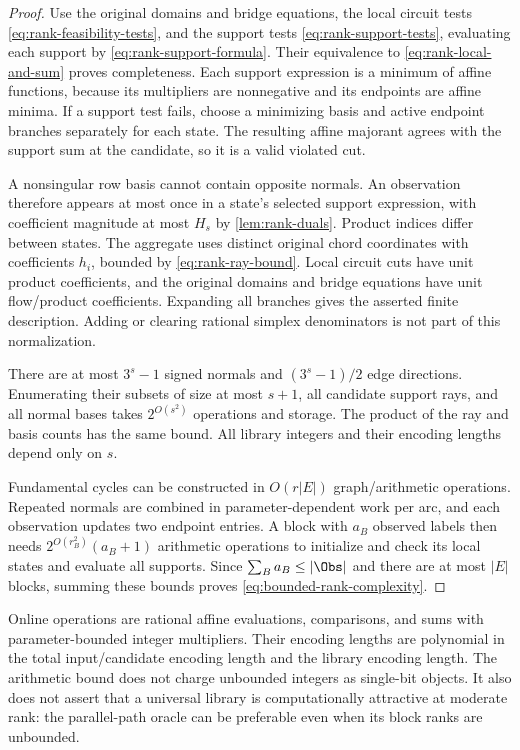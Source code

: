 \begin{proof}
Use the original domains and bridge equations, the local circuit tests
\eqref{eq:rank-feasibility-tests}, and the support tests
\eqref{eq:rank-support-tests}, evaluating each support by
\eqref{eq:rank-support-formula}. Their equivalence to
\eqref{eq:rank-local-and-sum} proves completeness. Each support expression
is a minimum of affine functions, because its multipliers are nonnegative
and its endpoints are affine minima. If a support test fails, choose
a minimizing basis and active endpoint branches separately for each
state. The resulting affine majorant agrees with the support sum at
the candidate, so it is a valid violated cut.

A nonsingular row basis cannot contain opposite normals. An observation
therefore appears at most once in a state's selected support expression,
with coefficient magnitude at most $H_s$ by
\cref{lem:rank-duals}. Product indices differ between states. The
aggregate uses distinct original chord coordinates with coefficients
$h_i$, bounded by \eqref{eq:rank-ray-bound}. Local circuit cuts have
unit product coefficients, and the original domains and bridge equations
have unit flow/product coefficients. Expanding all branches gives the
asserted finite description. Adding or clearing rational simplex
denominators is not part of this normalization.

There are at most $3^s-1$ signed normals and $(3^s-1)/2$ edge directions.
Enumerating their subsets of size at most $s+1$, all candidate support
rays, and all normal bases takes $2^{O(s^2)}$ operations and storage.
The product of the ray and basis counts has the same bound. All library
integers and their encoding lengths depend only on $s$.

Fundamental cycles can be constructed in $O(r|E|)$ graph/arithmetic
operations. Repeated normals are combined in parameter-dependent work
per arc, and each observation updates two endpoint entries. A block
with $a_B$ observed labels then needs
$2^{O(r_B^2)}(a_B+1)$ arithmetic operations to initialize and check its
local states and evaluate all supports. Since
$\sum_Ba_B\le|\Obs|$ and there are at most $|E|$ blocks, summing
these bounds proves \eqref{eq:bounded-rank-complexity}.
\end{proof}

Online operations are rational affine evaluations, comparisons, and sums
with parameter-bounded integer multipliers. Their encoding lengths are
polynomial in the total input/candidate encoding length and the library
encoding length. The arithmetic bound does not charge unbounded integers
as single-bit objects. It also does not assert that a universal library
is computationally attractive at moderate rank: the parallel-path oracle
can be preferable even when its block ranks are unbounded.


